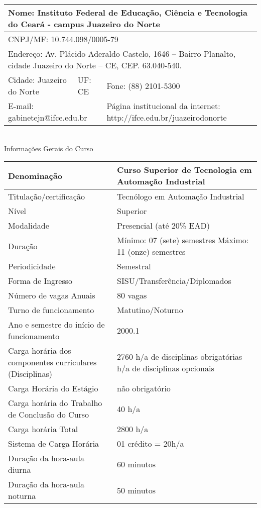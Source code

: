 \begin{tabular}{|p{5cm}|p{1.5cm}|p{7cm}|}
\hline 
\multicolumn{3}{|p{14cm}|}{Nome: Instituto Federal de Educação, Ciência e Tecnologia do Ceará - campus Juazeiro do Norte} \\ 
\hline 
\multicolumn{3}{|p{14cm}|}{CNPJ/MF: 10.744.098/0005-79} \\ 
\hline 
\multicolumn{3}{|p{14cm}|}{Endereço: Av. Plácido Aderaldo Castelo, 1646 – Bairro Planalto, cidade
Juazeiro do Norte – CE, CEP. 63.040-540.} \\ 
\hline 
Cidade: Juazeiro do Norte & UF:
CE & Fone: (88) 2101-5300 \\ 
\hline 
\multicolumn{2}{|p{7cm}|}{E-mail: gabinetejn@ifce.edu.br} & Página institucional da internet:
http://ifce.edu.br/juazeirodonorte \\ 
\hline 
\end{tabular} \\

\vspace{1cm}
Informações Gerais do Curso

\begin{tabular}{|p{7cm}|p{7cm}|}
\hline 
Denominação & Curso Superior de
Tecnologia em Automação
Industrial \\ 
\hline 
Titulação/certificação & Tecnólogo em Automação
Industrial \\ 
\hline 
Nível & Superior \\ 
\hline 
Modalidade & Presencial (até 20\% EAD) \\ 
\hline 
Duração & Mínimo: 07 (sete) semestres \newline
Máximo: 11 (onze) semestres \\ 
\hline 
Periodicidade & Semestral \\ 
\hline 
Forma de Ingresso & SISU/Transferência/Diplomados \\ 
\hline 
Número de vagas Anuais & 80 vagas \\ 
\hline 
Turno de funcionamento & Matutino/Noturno \\ 
\hline 
Ano e semestre do início de funcionamento & 2000.1 \\ 
\hline 
Carga horária dos
componentes curriculares
(Disciplinas) & 2760 h/a de
disciplinas
obrigatórias 
\newline
40 h/a de disciplinas opcionais \\ 
\hline 
Carga Horária do Estágio & não obrigatório \\ 
\hline 
Carga horária do Trabalho de Conclusão do Curso & 40 h/a \\ 
\hline 
Carga horária Total & 2800 h/a \\ 
\hline 
Sistema de Carga Horária & 01 crédito = 20h/a \\ 
\hline 
Duração da hora-aula diurna & 60 minutos \\ 
\hline 
Duração da hora-aula noturna & 50 minutos \\
\hline 
\end{tabular}

